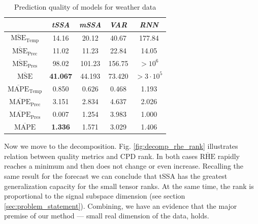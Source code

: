 \documentclass[referee, pdflatex]{sn-jnl}
\theoremstyle{definition}
\theoremstyle{plain}
\begin{document}
	\def\arraystretch{1.1}
	\begin{table}[h]
		\centering
		\caption{Prediction quality of models for weather data}\label{tab:pred_res_weather}
		\begin{tabular}{|c|c|c|c|c|}
			\hline
			& \textit{tSSA}                & \textit{mSSA} & \textit{VAR} & \textit{RNN} \\ \hline
			$ \overline{\text{MSE}}_{\text{Temp}} $  & 14.16                        & 20.12         & 40.67        & 177.84            \\ \hline
			$ \overline{\text{MSE}}_{\text{Prec}} $  & 11.02                        & 11.23         & 22.84        & 14.05            \\ \hline
			$ \overline{\text{MSE}}_{\text{Pres}} $  & 98.02                        & 101.23        & 156.75       & $ > 10^6 $            \\ \hline
			$ \overline{\text{MSE}} $        & \textbf{41.067}              & 44.193        & 73.420       & $> 3 \cdot 10^5$            \\ \hline
			$ \overline{\text{MAPE}}_{\text{Temp}} $ & 0.850 & 0.626         & 0.468        & 1.193            \\ \hline
			$ \overline{\text{MAPE}}_{\text{Prec}} $ & 3.151 & 2.834         & 4.637        & 2.026            \\ \hline
			$ \overline{\text{MAPE}}_{\text{Pres}} $ & 0.007 & 1.254         & 3.983        & 1.000            \\ \hline
			$ \overline{\text{MAPE}} $       & \textbf{1.336}               & 1.571         & 3.029        & 1.406            \\ \hline
		\end{tabular}
	\end{table}
	
	Now we move to the decomposition. Fig. \ref{fig:decomp_rhe_rank} illustrates relation between quality metrics and CPD rank. In both cases $ \overline{\text{RHE}} $ rapidly reaches a minimum and then does not change or even increase. Recalling the same result for the forecast we can conclude that tSSA has the greatest generalization capacity for the small tensor ranks. At the same time, the rank is proportional to the signal subspace dimension (see section \ref{sec:problem_statement}). Combining, we have an evidence that the major premise of our method --- small real dimension of the data, holds.
	
\end{document}
